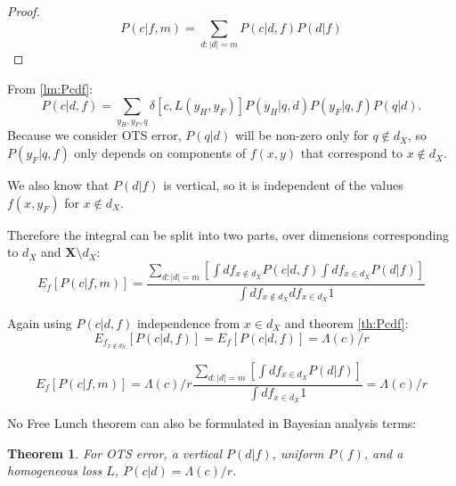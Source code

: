 \documentclass[a4paper]{article}
\newtheorem{theorem}{Theorem}[section]
\begin{document}
\begin{proof}
  \begin{equation}
    P\left(c|f,m\right) = \sum_{d:|d|=m} P\left(c|d,f\right)P\left(d|f\right)
  \end{equation}
\end{proof}

From \ref{lm:Pcdf}:
\begin{equation}
  P(c|d,f) = \sum_{y_H,y_F,q}\delta\left[c,L\left(y_H, y_F\right)\right] P\left(y_H|q, d\right)
  P\left(y_F| q, f\right)P\left(q|d\right).
\end{equation}
Because we consider OTS error, $P\left(q|d\right)$ will be non-zero
only for $q \notin d_X$, so $P\left(y_F| q, f\right)$ only depends on
components of $f(x,y)$ that correspond to $x\notin d_X$.

We also know that $P\left(d|f\right)$ is vertical, so it is
independent of the values $f(x,y_F)$ for $x \notin d_X$.

Therefore the integral can be split into two parts, over dimensions
corresponding to $d_X$ and $\mathbf{X} \setminus d_X$:
\begin{equation}
  E_f \left[P\left(c|f,m\right)\right] = \frac{\sum_{d:|d|=m}
    \left[\int df_{x\notin d_X} P\left(c|d,f \right)
      \int df_{x \in d_X} P\left(d|f\right)\right]}{\int df_{x\notin d_X} df_{x \in d_X} 1}
\end{equation}

Again using $P\left(c|d, f\right)$ independence from $x\in d_X$ and theorem \ref{th:Pcdf}:
\begin{equation}
  E_{f_{x\notin d_X}} \left[P\left(c|d, f\right)\right] = E_f \left[P\left(c|d, f\right)\right] = 
  \Lambda(c)/r
\end{equation}

\begin{equation}
  E_f \left[P\left(c|f,m\right)\right] = \Lambda(c)/r \frac{\sum_{d:|d|=m}
    \left[\int df_{x \in d_X} P\left(d|f\right)\right]}{\int df_{x \in d_X} 1} =
  \Lambda(c)/r
\end{equation}

No Free Lunch theorem can also be formulated in Bayesian analysis
terms:
\begin{theorem}
  For OTS error, a vertical $P(d|f)$, uniform $P(f)$, and a
  homogeneous loss $L$, $P(c|d) = \Lambda(c)/r$.
  \label{Pcd}
\end{theorem}
\end{document}
